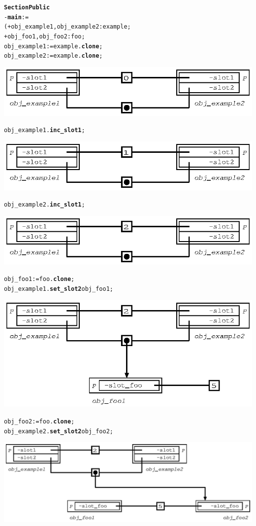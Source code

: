\documentclass[11pt]{mybook}
\begin{document}
\begin{alltt}
{\bf{}Section Public}
  - {\bf{}main} := 
  ( + obj_example1,obj_example2:{\sc{}example};
    + obj_foo1,obj_foo2:{\sc{}foo};
    obj_example1 := {\sc{}example}.{\bf{}clone};
    obj_example2 := {\sc{}example}.{\bf{}clone};
\begin{center}
\includegraphics[scale=1.0]{figures/shared_slot3}
\end{center}
    obj_example1.{\bf{}inc\_slot1};
\begin{center}
\includegraphics[scale=1.0]{figures/shared_slot4}
\end{center}
   obj_example2.{\bf{}inc\_slot1};
\begin{center}
\includegraphics[scale=1.0]{figures/shared_slot5}
\end{center}
   obj_foo1 := {\sc{}foo}.{\bf{}clone};
   obj_example1.{\bf{}set\_slot2} obj_foo1;
\begin{center}
\includegraphics[scale=1.0]{figures/shared_slot6}
\end{center}
   obj_foo2 := {\sc{}foo}.{\bf{}clone};
   obj_example2.{\bf{}set\_slot2} obj_foo2;
\begin{center}
\includegraphics[scale=1.0]{figures/shared_slot7}
\end{center}
\end{alltt}
\end{document}
